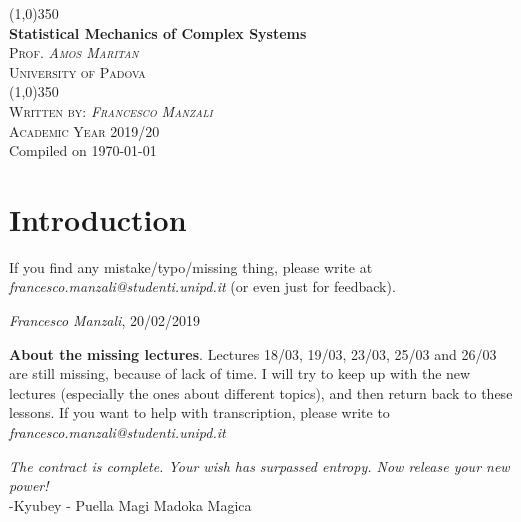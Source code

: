 \documentclass[12pt,a4paper]{report} %
\theoremstyle{plain}
\theoremstyle{definition}
\newenvironment{appr}{\begin{mdframed}[hidealllines=true,backgroundcolor=blue!10,innerleftmargin=3pt,innerrightmargin=3pt,leftmargin=-3pt,rightmargin=-3pt]}{\end{mdframed}} %
\begin{document}
\begin{center}
                \line (1,0){350} \\
                \huge{\bfseries Statistical Mechanics of Complex Systems}\\
                [2mm]
                \textsc{\normalsize Prof. \textit{Amos Maritan}}
                \vspace{-0.5em}\\
                \textsc{\normalsize University of Padova}\\
                \vspace{-1em}
                \line (1,0){350} \\
        [0.2cm]
        \textsc{\normalsize Written by: \textit{Francesco Manzali}}\\
                \textsc{\normalsize Academic Year 2019/20}\\ 
        {\scriptsize Compiled on \today}\\
        [0.2cm]
        {\scriptsize \doclicenseLongText}
\end{center}


\tableofcontents 
\clearpage
\section*{Introduction}
If you find any mistake/typo/missing thing, please write at \textit{francesco.manzali@studenti.unipd.it} (or even just for feedback).

\begin{flushright}
\textit{Francesco Manzali}, 20/02/2019
\end{flushright}


\begin{appr}
\textbf{About the missing lectures}. Lectures 18/03, 19/03, 23/03, 25/03 and 26/03 are still missing, because of lack of time. I will try to keep up with the new lectures (especially the ones about different topics), and then return back to these lessons. If you want to help with transcription, please write to \textit{francesco.manzali@studenti.unipd.it}
\end{appr}

\begin{flushright}
\textit{The contract is complete. Your wish has surpassed entropy. Now release your new power!}\\
-Kyubey - Puella Magi Madoka Magica
\end{flushright}
\end{document}
